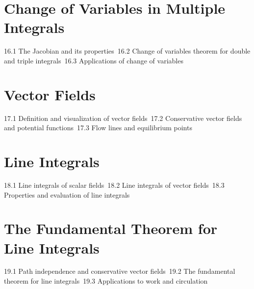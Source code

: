 \section{Change of Variables in Multiple Integrals}
16.1 The Jacobian and its properties\
16.2 Change of variables theorem for double and triple integrals\
16.3 Applications of change of variables\
\section{Vector Fields}
17.1 Definition and visualization of vector fields\
17.2 Conservative vector fields and potential functions\
17.3 Flow lines and equilibrium points\
\section{Line Integrals}
18.1 Line integrals of scalar fields\
18.2 Line integrals of vector fields\
18.3 Properties and evaluation of line integrals\
\section{The Fundamental Theorem for Line Integrals}
19.1 Path independence and conservative vector fields\
19.2 The fundamental theorem for line integrals\
19.3 Applications to work and circulation\
